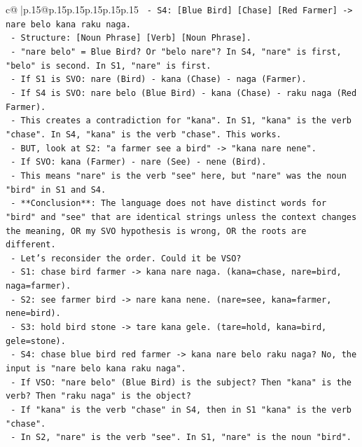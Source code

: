 \documentclass{article}
\begin{document}
{\begin{supertabular}{c@{$\;$}|p{.15\linewidth}@{}p{.15\linewidth}p{.15\linewidth}p{.15\linewidth}p{.15\linewidth}p{.15\linewidth}}
{{{\texttt{   {-} S4: {[}Blue Bird{]} {[}Chase{]} {[}Red Farmer{]} {-}> nare belo kana raku naga.} \\
\texttt{     {-} Structure: {[}Noun Phrase{]} {[}Verb{]} {[}Noun Phrase{]}.} \\
\texttt{     {-} "nare belo" = Blue Bird? Or "belo nare"? In S4, "nare" is first, "belo" is second. In S1, "nare" is first.} \\
\texttt{     {-} If S1 is SVO: nare (Bird) {-} kana (Chase) {-} naga (Farmer).} \\
\texttt{     {-} If S4 is SVO: nare belo (Blue Bird) {-} kana (Chase) {-} raku naga (Red Farmer).} \\
\texttt{     {-} This creates a contradiction for "kana". In S1, "kana" is the verb "chase". In S4, "kana" is the verb "chase". This works.} \\
\texttt{     {-} BUT, look at S2: "a farmer see a bird" {-}> "kana nare nene".} \\
\texttt{       {-} If SVO: kana (Farmer) {-} nare (See) {-} nene (Bird).} \\
\texttt{       {-} This means "nare" is the verb "see" here, but "nare" was the noun "bird" in S1 and S4.} \\
\texttt{       {-} **Conclusion**: The language does not have distinct words for "bird" and "see" that are identical strings unless the context changes the meaning, OR my SVO hypothesis is wrong, OR the roots are different.} \\
\texttt{       {-} Let's reconsider the order. Could it be VSO?} \\
\texttt{         {-} S1: chase bird farmer {-}> kana nare naga. (kana=chase, nare=bird, naga=farmer).} \\
\texttt{         {-} S2: see farmer bird {-}> nare kana nene. (nare=see, kana=farmer, nene=bird).} \\
\texttt{         {-} S3: hold bird stone {-}> tare kana gele. (tare=hold, kana=bird, gele=stone).} \\
\texttt{         {-} S4: chase blue bird red farmer {-}> kana nare belo raku naga? No, the input is "nare belo kana raku naga".} \\
\texttt{         {-} If VSO: "nare belo" (Blue Bird) is the subject? Then "kana" is the verb? Then "raku naga" is the object?} \\
\texttt{           {-} If "kana" is the verb "chase" in S4, then in S1 "kana" is the verb "chase".} \\
\texttt{           {-} In S2, "nare" is the verb "see". In S1, "nare" is the noun "bird".} \\
}}}
\end{supertabular}}
\end{document}
